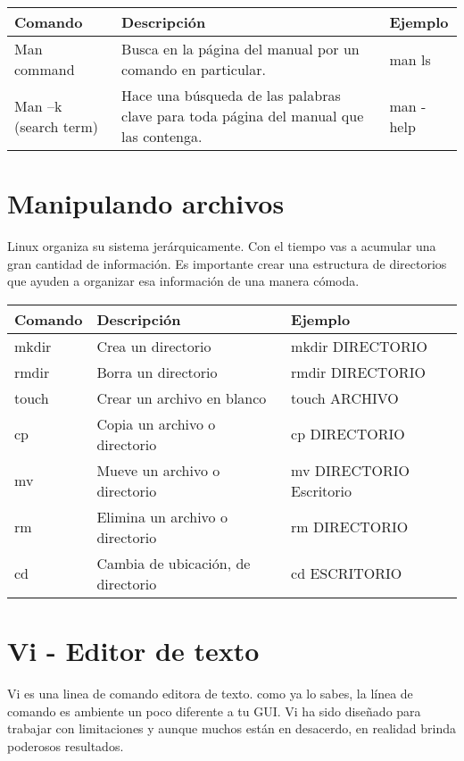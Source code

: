 \documentclass[12pt]{article}
\begin{document}
\begin{tabular}{|p{4cm}|p{6cm}|p{4cm}|}
\hline
Comando & Descripción & Ejemplo \\
\hline
Man command & Busca en la página del manual por un comando en particular. & man ls\\ \hline
Man –k (search term) & Hace una búsqueda de las palabras clave para toda página del manual que las contenga. & man -help\\ \hline
\end{tabular}

\section{Manipulando archivos}

Linux organiza su sistema jerárquicamente. Con el tiempo vas a acumular una gran cantidad de información. Es importante crear una estructura de directorios que ayuden a organizar esa información de una manera cómoda.\\

\begin{tabular}{|p{4cm}|p{6cm}|p{4cm}|}
\hline
Comando & Descripción & Ejemplo \\
\hline
mkdir & Crea un directorio & mkdir DIRECTORIO \\ \hline
rmdir & Borra un directorio & rmdir DIRECTORIO \\ \hline
touch & Crear un archivo en blanco & touch ARCHIVO \\ \hline
cp & Copia un archivo o directorio & cp DIRECTORIO \\ \hline
mv & Mueve un archivo o directorio & mv DIRECTORIO Escritorio \\ \hline
rm & Elimina un archivo o directorio & rm DIRECTORIO \\ \hline
cd & Cambia de ubicación, de directorio & cd ESCRITORIO \\ \hline
\end{tabular}

\section{Vi - Editor de texto}

Vi es una linea de comando editora de texto. como ya lo sabes, la línea de comando es ambiente un poco diferente a tu GUI. Vi ha sido diseñado para trabajar con limitaciones y aunque muchos están en desacerdo, en realidad brinda poderosos resultados.\\
\end{document}
